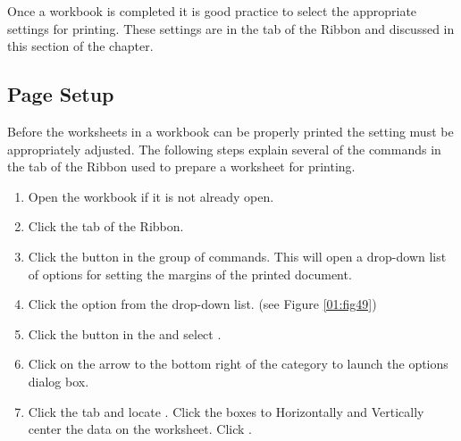 Once a workbook is completed it is good practice to select the appropriate settings for printing. These settings are in the  tab of the Ribbon and discussed in this section of the chapter.

\subsection{Page Setup}

Before the worksheets in a workbook can be properly printed the setting must be appropriately adjusted. The following steps explain several of the commands in the  tab of the Ribbon used to prepare a worksheet for printing.

\begin{enumerate}
	\item Open the  workbook if it is not already open.
	\item Click the  tab of the Ribbon.
	\item Click the  button in the  group of commands. This will open a drop-down list of options for setting the margins of the printed document.
	\item Click the  option from the  drop-down list. (see Figure \ref{01:fig49})
	\item Click the  button in the  and select .
	\item Click on the arrow to the bottom right of the  category to launch the  options dialog box.
	\item Click the  tab and locate . Click the boxes to Horizontally and Vertically center the data on the worksheet. Click .

\end{enumerate}

